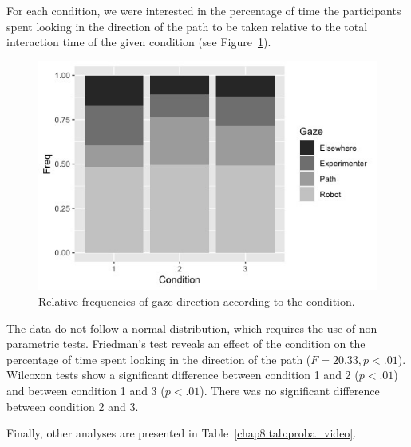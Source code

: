 \documentclass[a4paper,11pt,twoside]{StyleThese}
\begin{document}
For each condition, we were interested in the percentage of time the participants spent looking in the direction of the path to be taken relative to the total interaction time of the given condition (see Figure~\ref{chap8:fig:look_video}). 

\begin{figure}[!htb]
	\centering
	\includegraphics[width=0.8\linewidth]{figures/chapter3/freqRegard.jpeg}
	\caption{Relative frequencies of gaze direction according to the condition.}
	\label{chap8:fig:look_video}
\end{figure} 

The data do not follow a normal distribution, which requires the use of non-parametric tests. Friedman's test reveals an effect of the condition on the percentage of time spent looking in the direction of the path ($F=20.33, p<.01$). Wilcoxon tests show a significant difference between condition 1 and 2 ($p<.01$) and between condition 1 and 3 ($p<.01$). There was no significant difference between condition 2 and 3.

Finally, other analyses are presented in Table~\ref{chap8:tab:proba_video}.
\end{document}
